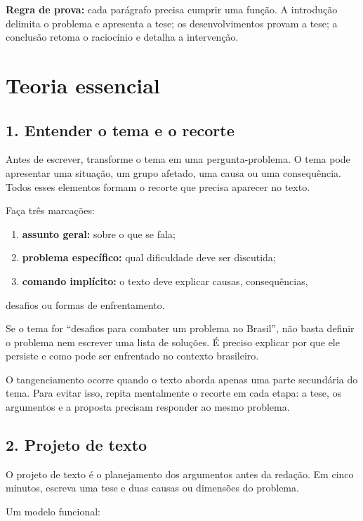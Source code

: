 \documentclass[11pt,a4paper]{article}
\begin{document}
\textbf{Regra de prova:} cada parágrafo precisa cumprir uma função. A introdução delimita o problema e apresenta a tese; os desenvolvimentos provam a tese; a conclusão retoma o raciocínio e detalha a intervenção.

\section*{Teoria essencial}

\subsection*{1. Entender o tema e o recorte}

Antes de escrever, transforme o tema em uma pergunta-problema. O tema pode apresentar uma situação, um grupo afetado, uma causa ou uma consequência. Todos esses elementos formam o recorte que precisa aparecer no texto.

Faça três marcações:

\begin{enumerate}
  \item \textbf{assunto geral:} sobre o que se fala;
  \item \textbf{problema específico:} qual dificuldade deve ser discutida;
  \item \textbf{comando implícito:} o texto deve explicar causas, consequências,
\end{enumerate}

   desafios ou formas de enfrentamento.

Se o tema for “desafios para combater um problema no Brasil”, não basta definir o problema nem escrever uma lista de soluções. É preciso explicar por que ele persiste e como pode ser enfrentado no contexto brasileiro.

O tangenciamento ocorre quando o texto aborda apenas uma parte secundária do tema. Para evitar isso, repita mentalmente o recorte em cada etapa: a tese, os argumentos e a proposta precisam responder ao mesmo problema.

\subsection*{2. Projeto de texto}

O projeto de texto é o planejamento dos argumentos antes da redação. Em cinco minutos, escreva uma tese e duas causas ou dimensões do problema.

Um modelo funcional:
\end{document}
